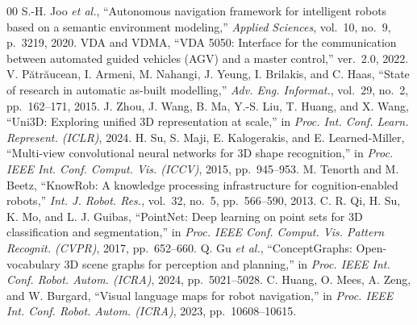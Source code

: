 \documentclass[conference]{IEEEtran}
\begin{document}
\begin{thebibliography}{00}
 S.-H. Joo \emph{et al.}, ``Autonomous navigation
framework for intelligent robots based on a semantic environment modeling,''
\emph{Applied Sciences}, vol.~10, no.~9, p.~3219, 2020.
 VDA and VDMA, ``VDA 5050: Interface for the communication
between automated guided vehicles (AGV) and a master control,'' ver.~2.0,
2022.
 V. P\u{a}tr\u{a}ucean, I. Armeni, M. Nahangi,
J. Yeung, I. Brilakis, and C. Haas, ``State of research in automatic
as-built modelling,'' \emph{Adv. Eng. Informat.}, vol.~29, no.~2,
pp.~162--171, 2015.
 J. Zhou, J. Wang, B. Ma, Y.-S. Liu, T. Huang, and
X. Wang, ``Uni3D: Exploring unified 3D representation at scale,'' in
\emph{Proc. Int. Conf. Learn. Represent. (ICLR)}, 2024.
 H. Su, S. Maji, E. Kalogerakis, and E.
Learned-Miller, ``Multi-view convolutional neural networks for 3D shape
recognition,'' in \emph{Proc. IEEE Int. Conf. Comput. Vis. (ICCV)}, 2015,
pp.~945--953.
 M. Tenorth and M. Beetz, ``KnowRob: A knowledge
processing infrastructure for cognition-enabled robots,'' \emph{Int. J.
Robot. Res.}, vol.~32, no.~5, pp.~566--590, 2013.
 C. R. Qi, H. Su, K. Mo, and L. J. Guibas, ``PointNet: Deep
learning on point sets for 3D classification and segmentation,'' in
\emph{Proc. IEEE Conf. Comput. Vis. Pattern Recognit. (CVPR)}, 2017,
pp.~652--660.
 Q. Gu \emph{et al.}, ``ConceptGraphs:
Open-vocabulary 3D scene graphs for perception and planning,'' in
\emph{Proc. IEEE Int. Conf. Robot. Autom. (ICRA)}, 2024, pp.~5021--5028.
 C. Huang, O. Mees, A. Zeng, and W. Burgard,
``Visual language maps for robot navigation,'' in \emph{Proc. IEEE Int.
Conf. Robot. Autom. (ICRA)}, 2023, pp.~10608--10615.
\end{thebibliography}
\end{document}
